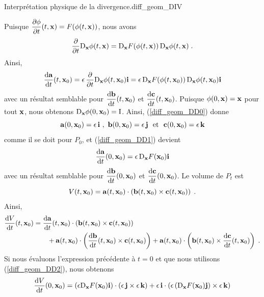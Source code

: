 {
{Interprétation physique de la divergence.}{diff_geom_DIV}

Puisque $\DS \pdydx{\phi}{t}(t,\VEC{x}) = F(\phi(t,\VEC{x}))$,
nous avons
\[
\pdfdx{ \diff_{\VEC{x}} \phi(t,\VEC{x}) }{t}
= \diff_{\VEC{x}} F(\phi(t,\VEC{x})) \, \diff_{\VEC{x}}
\phi(t,\VEC{x}) \; .
\]
Ainsi,
\begin{equation} \label{diff_geom_DD1}
\dydx{\VEC{a}}{t}(t,\VEC{x}_0) = \epsilon\, \pdfdx{
\diff_{\VEC{x}} \phi(t,\VEC{x}_0)}{t} \ii
= \epsilon\,
\diff_{\VEC{x}} F(\phi(t,\VEC{x}_0)) \, \diff_{\VEC{x}}
\phi(t,\VEC{x}_0) \ii
\end{equation}
avec un résultat semblable pour
$\DS \dydx{\VEC{b}}{t}(t,\VEC{x}_0)$ et
$\DS \dydx{\VEC{c}}{t}(t,\VEC{x}_0)$.
Puisque $\phi(0,\VEC{x}) = \VEC{x}$ pour tout $\VEC{x}$, nous obtenons
$\diff_{\VEC{x}} \phi(0,\VEC{x}_0) = \Id$. Ainsi, (\ref{diff_geom_DD0})
donne
\[
  \VEC{a}(0,\VEC{x}_0) = \epsilon\, \ii \ ,
  \ \VEC{b}(0,\VEC{x}_0) = \epsilon\, \jj
\ \text{ et }\ \VEC{c}(0,\VEC{x}_0) = \epsilon\, \kk
\]
comme il se doit pour $P_0$, et (\ref{diff_geom_DD1}) devient
\begin{equation} \label{diff_geom_DD2}
\dydx{\VEC{a}}{t}(0,\VEC{x}_0) = \epsilon\, \diff_{\VEC{x}}
F(\VEC{x}_0) \ii
\end{equation}
avec un résultat semblable pour
$\DS \dydx{\VEC{b}}{t}(0,\VEC{x}_0)$ et
$\DS \dydx{\VEC{c}}{t}(0,\VEC{x}_0)$.  Le volume de $P_t$ est
\[
V(t,\VEC{x}_0) = \VEC{a}(t,\VEC{x}_0) \cdot \left(\VEC{b}(t,\VEC{x}_0) \times
\VEC{c}(t,\VEC{x}_0) \right) \; .
\]
Ainsi,
\begin{align*}
\dydx{V}{t}(t,\VEC{x}_0) &=
\dydx{\VEC{a}}{t}(t,\VEC{x}_0) \cdot \left(\VEC{b}(t,\VEC{x}_0) \times
\VEC{c}(t,\VEC{x}_0) \right) \\
& \qquad
  + \VEC{a}(t,\VEC{x}_0) \cdot \left(\dydx{\VEC{b}}{t}(t,\VEC{x}_0) \times
\VEC{c}(t,\VEC{x}_0) \right)
+ \VEC{a}(t,\VEC{x}_0) \cdot \left(\VEC{b}(t,\VEC{x}_0) \times
\dydx{\VEC{c}}{t}(t,\VEC{x}_0) \right) \; .
\end{align*}
Si nous évaluons l'expression précédente à $t=0$ et que nous utilisons
(\ref{diff_geom_DD2}), nous obtenons
\begin{align*}
\dydx{V}{t}(0,\VEC{x}_0) &=
\left(\epsilon \diff_{\VEC{x}} F(\VEC{x}_0) \ii \right)
\cdot \left(\epsilon\, \jj \times \epsilon\, \kk \right)
+ \epsilon\, \ii \cdot \left(\epsilon
\left(\diff_{\VEC{x}} F(\VEC{x}_0)\jj \right)
\times \epsilon\,\kk \right) \\

\end{align*}}
